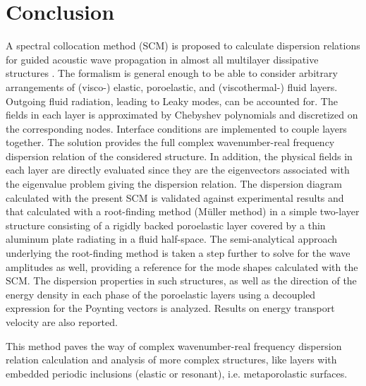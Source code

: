 \section{Conclusion}
A spectral collocation method (SCM) is proposed to calculate dispersion relations for guided acoustic wave propagation in almost all multilayer dissipative structures . The formalism is general enough to be able to consider arbitrary arrangements of (visco-) elastic, poroelastic, and (viscothermal-) fluid layers. Outgoing fluid radiation, leading to Leaky modes, can be accounted for. The fields in each layer is approximated by Chebyshev polynomials and discretized on the corresponding nodes. Interface conditions are implemented to couple layers together. The solution provides the full complex wavenumber-real frequency dispersion relation of the considered structure. In addition, the physical fields in each layer are directly evaluated since they are the eigenvectors associated with the eigenvalue problem giving the dispersion relation. The dispersion diagram calculated with the present SCM is validated against experimental results and that calculated with a root-finding method (M\"uller method) in a simple two-layer structure consisting of a rigidly backed poroelastic layer covered by a thin aluminum plate radiating in a fluid half-space. The semi-analytical approach underlying the root-finding method is taken a step further to solve for the wave amplitudes as well, providing a reference for the mode shapes calculated with the SCM.  The dispersion properties in such structures, as well as the direction of the energy density in each phase of the poroelastic layers using a decoupled expression for the Poynting vectors is analyzed. Results on energy transport velocity are also reported. 

This method paves the way of complex wavenumber-real frequency dispersion relation calculation and analysis of more complex structures, like layers with embedded periodic inclusions (elastic or resonant), i.e. metaporolastic surfaces.      


